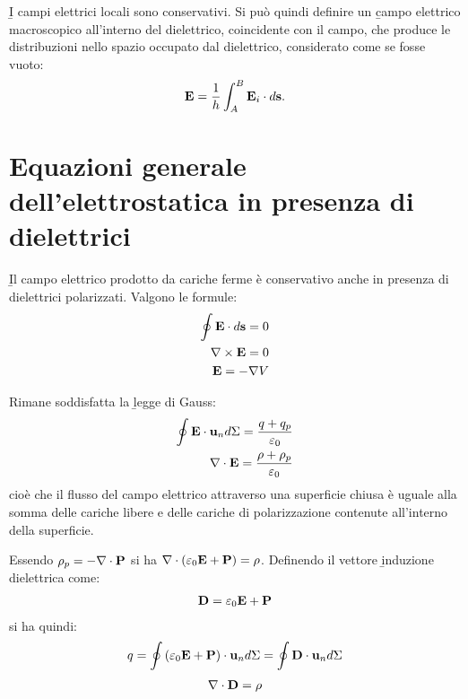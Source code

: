 \b{I campi elettrici locali sono conservativi}. Si può quindi definire un \b{campo elettrico macroscopico all'interno del dielettrico}, coincidente con il campo, che produce le distribuzioni nello spazio occupato dal dielettrico, considerato come se fosse vuoto:
\begin{equation}\begin{split}
\mathbf{E}=\frac{1}{h}\int_A^B{\mathbf{E}_i\cdot d\mathbf{s}}.
\end{split}\end{equation}

\section{Equazioni generale dell'elettrostatica in presenza di dielettrici}%
\b{Il campo elettrico prodotto da cariche ferme è conservativo anche in presenza di dielettrici polarizzati}. Valgono le formule:
\begin{equation}\begin{split}
\oint{\mathbf{E}\cdot d\mathbf{s}}=0\\
\nabla\times\mathbf{E}=0\\
\mathbf{E}=-\nabla V
\end{split}\end{equation}

Rimane soddisfatta la \b{legge di Gauss}:
\begin{equation}\begin{split}
\oint{\mathbf{E\cdot u}_nd\Sigma}=\frac{q+q_p}{\varepsilon_0}\\
\nabla\cdot\mathbf{E}=\frac{\rho+\rho_p}{\varepsilon_0}
\end{split}\end{equation}
cioè che il flusso del campo elettrico attraverso una superficie chiusa è uguale alla somma delle cariche libere e delle cariche di polarizzazione contenute all'interno della superficie.

Essendo $\rho_p=-\nabla\cdot \mathbf{P}$ si ha $\nabla\cdot(\varepsilon_0\mathbf{E}+\mathbf{P})=\rho$. Definendo il vettore \b{induzione dielettrica} come:
\begin{equation}\begin{split}
\mathbf{D}=\varepsilon_0\mathbf{E}+\mathbf{P}
 \end{split}\end{equation}
si ha quindi:
\begin{equation}\begin{split}
q=\oint{(\varepsilon_0\mathbf{E}+\mathbf{P})\cdot\mathbf{u}_nd\Sigma}=\oint{\mathbf{D\cdot u}_nd\Sigma}
\end{split}\end{equation}
\begin{equation}\begin{split}
\nabla\cdot\mathbf{D}=\rho
\end{split}\end{equation}

